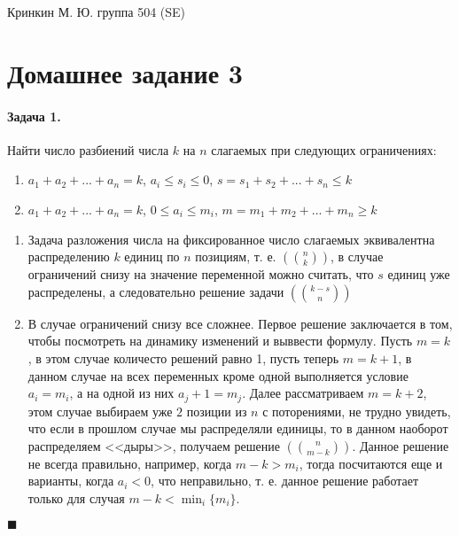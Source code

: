 \documentclass[a4paper,12pt]{article}
\begin{document}
\sloppy

\lstset{
	basicstyle=\small,
	stringstyle=\ttfamily,
	showstringspaces=false,
	columns=fixed,
	breaklines=true,
	numbers=right,
	numberstyle=\tiny
}

\newtheorem{Def}{Определение}[section]
\newtheorem{Th}{Теорема}
\newtheorem{Lem}[Th]{Лемма}
\newenvironment{Proof}
	{\par\noindent{\bf Доказательство.}}
	{\hfill$\scriptstyle\blacksquare$}
\newenvironment{Solution}
	{\par\noindent{\bf Решение.}}
	{\hfill$\scriptstyle\blacksquare$}


\begin{flushright}
	Кринкин М. Ю. группа 504 (SE)
\end{flushright}

\section{Домашнее задание 3}

\paragraph{Задача 1.} Найти число разбиений числа $k$ на $n$ слагаемых при следующих ограничениях:
\begin{enumerate}
\item $a_1+a_2+...+a_n=k$, $a_i \le s_i \le 0$, $s=s_1+s_2+...+s_n \le k$

\item $a_1+a_2+...+a_n=k$, $0 \le a_i \le m_i$, $m=m_1+m_2+...+m_n \ge k$
\end{enumerate}

\begin{Solution}
\begin{enumerate}
\item Задача разложения числа на фиксированное число слагаемых эквивалентна распределению $k$ единиц по $n$ позициям, т. е. $\left(\binom{n}{k}\right)$, в случае ограничений снизу на значение переменной можно считать, что $s$ единиц уже распределены, а следовательно решение задачи $\left(\binom{k-s}{n}\right)$

\item В случае ограничений снизу все сложнее. Первое решение заключается в том, чтобы посмотреть на динамику изменений и выввести формулу. Пусть $m = k$, в этом случае количесто решений равно 1, пусть теперь $m = k+1$, в данном случае на всех переменных кроме одной выполняется условие $a_i=m_i$, а на одной из них $a_j+1 = m_j$. Далее рассматриваем $m=k+2$,  этом случае выбираем уже $2$ позиции из $n$ с поторениями, не трудно увидеть, что если в прошлом случае мы распределяли единицы, то в данном наоборот распределяем <<дыры>>, получаем решение $\left(\binom{n}{m-k}\right)$. Данное решение не всегда правильно, например, когда $m-k > m_i$, тогда посчитаются еще и варианты, когда $a_i<0$, что неправильно, т. е. данное решение работает только для случая $m-k < \min_{i}\{m_i\}$.
\end{enumerate}
\end{Solution}
\end{document}
